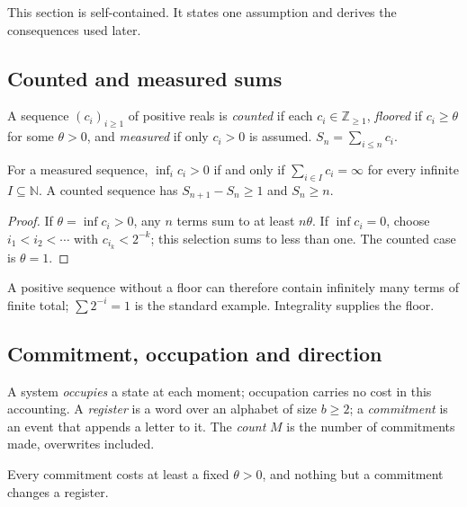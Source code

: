 \documentclass[10pt,twocolumn,a4paper]{article}
\newcommand{\Z}{\mathbb{Z}}
\newcommand{\N}{\mathbb{N}}
\begin{document}
This section is self-contained. It states one assumption and derives the
consequences used later.

\subsection{Counted and measured sums}

\begin{definition}
A sequence $(c_i)_{i\ge1}$ of positive reals is \emph{counted} if each
$c_i\in\Z_{\ge1}$, \emph{floored} if $c_i\ge\theta$ for some $\theta>0$, and
\emph{measured} if only $c_i>0$ is assumed. $S_n=\sum_{i\le n}c_i$.
\end{definition}

\begin{theorem}
\label{thm:selection}
For a measured sequence, $\inf_i c_i>0$ if and only if
$\sum_{i\in I}c_i=\infty$ for every infinite $I\subseteq\N$. A counted
sequence has $S_{n+1}-S_n\ge1$ and $S_n\ge n$.
\end{theorem}

\begin{proof}
If $\theta=\inf c_i>0$, any $n$ terms sum to at least $n\theta$. If
$\inf c_i=0$, choose $i_1<i_2<\cdots$ with $c_{i_k}<2^{-k}$; this selection
sums to less than one. The counted case is $\theta=1$.
\end{proof}

A positive sequence without a floor can therefore contain infinitely many
terms of finite total; $\sum2^{-i}=1$ is the standard example. Integrality
supplies the floor.

\subsection{Commitment, occupation and direction}

\begin{definition}
A system \emph{occupies} a state at each moment; occupation carries no cost
in this accounting. A \emph{register} is a word over an alphabet of size
$b\ge2$; a \emph{commitment} is an event that appends a letter to it. The
\emph{count} $M$ is the number of commitments made, overwrites included.
\end{definition}

\begin{postulate}
\label{post:counted}
Every commitment costs at least a fixed $\theta>0$, and nothing but a
commitment changes a register.
\end{postulate}
\end{document}
